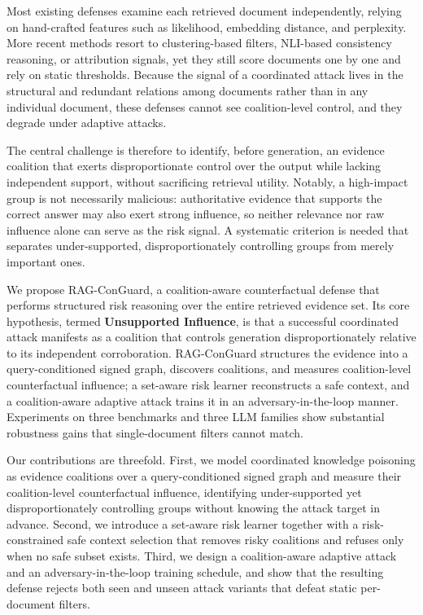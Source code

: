\documentclass[sigconf]{acmart}
\begin{document}
Most existing defenses examine each retrieved document independently, relying on hand-crafted features such as likelihood, embedding distance, and perplexity. More recent methods resort to clustering-based filters, NLI-based consistency reasoning, or attribution signals, yet they still score documents one by one and rely on static thresholds. Because the signal of a coordinated attack lives in the structural and redundant relations among documents rather than in any individual document, these defenses cannot see coalition-level control, and they degrade under adaptive attacks.

The central challenge is therefore to identify, before generation, an evidence coalition that exerts disproportionate control over the output while lacking independent support, without sacrificing retrieval utility. Notably, a high-impact group is not necessarily malicious: authoritative evidence that supports the correct answer may also exert strong influence, so neither relevance nor raw influence alone can serve as the risk signal. A systematic criterion is needed that separates under-supported, disproportionately controlling groups from merely important ones.

We propose RAG-ConGuard, a coalition-aware counterfactual defense that performs structured risk reasoning over the entire retrieved evidence set. Its core hypothesis, termed \textbf{Unsupported Influence}, is that a successful coordinated attack manifests as a coalition that controls generation disproportionately relative to its independent corroboration. RAG-ConGuard structures the evidence into a query-conditioned signed graph, discovers coalitions, and measures coalition-level counterfactual influence; a set-aware risk learner reconstructs a safe context, and a coalition-aware adaptive attack trains it in an adversary-in-the-loop manner. Experiments on three benchmarks and three LLM families show substantial robustness gains that single-document filters cannot match.

Our contributions are threefold. First, we model coordinated knowledge poisoning as evidence coalitions over a query-conditioned signed graph and measure their coalition-level counterfactual influence, identifying under-supported yet disproportionately controlling groups without knowing the attack target in advance. Second, we introduce a set-aware risk learner together with a risk-constrained safe context selection that removes risky coalitions and refuses only when no safe subset exists. Third, we design a coalition-aware adaptive attack and an adversary-in-the-loop training schedule, and show that the resulting defense rejects both seen and unseen attack variants that defeat static per-document filters.
\end{document}
